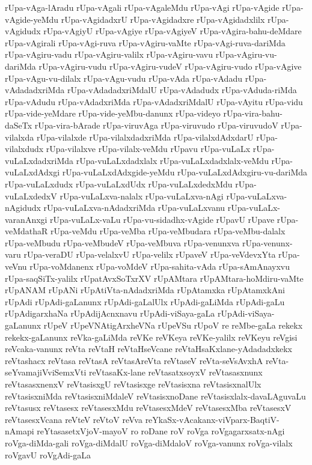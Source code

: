 {rUpa-vAga-lAradu
rUpa-vAgali
rUpa-vAgaleMdu
rUpa-vAgi
rUpa-vAgide
rUpa-vAgide-yeMdu
rUpa-vAgidadxrU
rUpa-vAgidadxre
rUpa-vAgidadxlilx
rUpa-vAgidudx
rUpa-vAgiyU
rUpa-vAgiye
rUpa-vAgiyeV
rUpa-vAgira-bahu-deMdare
rUpa-vAgirali
rUpa-vAgi-ruva
rUpa-vAgiru-vaMte
rUpa-vAgi-ruva-dariMda
rUpa-vAgiru-vadu
rUpa-vAgiru-valilx
rUpa-vAgiru-vavu
rUpa-vAgiru-vu-dariMda
rUpa-vAgiru-vudu
rUpa-vAgiru-vudeV
rUpa-vAgiru-vudo
rUpa-vAgive
rUpa-vAgu-vu-dilalx
rUpa-vAgu-vudu
rUpa-vAda
rUpa-vAdadu
rUpa-vAdadadxriMda
rUpa-vAdadadxriMdalU
rUpa-vAdadudx
rUpa-vAduda-riMda
rUpa-vAdudu
rUpa-vAdadxriMda
rUpa-vAdadxriMdalU
rUpa-vAyitu
rUpa-vidu
rUpa-vide-yeMdare
rUpa-vide-yeMbu-danunx
rUpa-videyo
rUpa-vira-bahu-daSeTx
rUpa-vira-bArade
rUpa-viruvAga
rUpa-viruvudo
rUpa-viruvudoV
rUpa-vilalxda
rUpa-vilalxde
rUpa-vilalxdadxriMda
rUpa-vilalxdAdxdarU
rUpa-vilalxdudx
rUpa-vilalxve
rUpa-vilalx-veMdu
rUpavu
rUpa-vuLaLx
rUpa-vuLaLxdadxriMda
rUpa-vuLaLxdadxlalx
rUpa-vuLaLxdadxlalx-veMdu
rUpa-vuLaLxdAdxgi
rUpa-vuLaLxdAdxgide-yeMdu
rUpa-vuLaLxdAdxgiru-vu-dariMda
rUpa-vuLaLxdudx
rUpa-vuLaLxdUdx
rUpa-vuLaLxdedxMdu
rUpa-vuLaLxdedxV
rUpa-vuLaLxva-nalalx
rUpa-vuLaLxva-nAgi
rUpa-vuLaLxva-nAgidudx
rUpa-vuLaLxva-nAdadxriMda
rUpa-vuLaLxvanu
rUpa-vuLaLx-varanAnxgi
rUpa-vuLaLx-vaLu
rUpa-vu-sidadhx-vAgide
rUpavU
rUpave
rUpa-veMdathaR
rUpa-veMdu
rUpa-veMba
rUpa-veMbudara
rUpa-veMbu-dalalx
rUpa-veMbudu
rUpa-veMbudeV
rUpa-veMbuva
rUpa-venunxva
rUpa-venunx-varu
rUpa-veraDU
rUpa-velalxvU
rUpa-velilx
rUpaveV
rUpa-veVdevxYta
rUpa-veVnu
rUpa-voMdanenx
rUpa-voMdeV
rUpa-sahita-vAda
rUpa-sAmAnayxvu
rUpa-saqSiTx-yalilx
rUpatAvxSoTxrXV
rUpAMtara
rUpAMtara-hoMdiru-vaMte
rUpANAM
rUpANi
rUpAtiVta-nAdadxriMda
rUpAtamxka
rUpAtamxkAni
rUpAdi
rUpAdi-gaLanunx
rUpAdi-gaLalUlx
rUpAdi-gaLiMda
rUpAdi-gaLu
rUpAdigarxhaNa
rUpAdijAcnxnavu
rUpAdi-viSaya-gaLa
rUpAdi-viSaya-gaLanunx
rUpeV
rUpeVNAtigArxheVNa
rUpeVSu
rUpoV
re
reMbe-gaLa
rekekx
rekekx-gaLanunx
reVka-gaLiMda
reVKe
reVKeya
reVKe-yalilx
reVKeyu
reVgisi
reVcaka-vanunx
reVta
reVtaH
reVtaHseVcane
reVtaHsaKxlane-yAdadadxkekx
reVtashacx
reVtasa
reVtasA
reVtasAreVta
reVtaseV
reVta-seVsAvxhA
reVta-seYvamajiVviSemxVti
reVtasaKx-lane
reVtasatxsoyxV
reVtasasxnunx
reVtasasxnenxV
reVtasisxgU
reVtasisxge
reVtasisxna
reVtasisxnalUlx
reVtasisxniMda
reVtasisxniMdaleV
reVtasisxnoDane
reVtasisxlalx-davaLAguvaLu
reVtasusx
reVtasesx
reVtasesxMdu
reVtasesxMdeV
reVtasesxMba
reVtasesxV
reVtasesxVcana
reVteV
reVtoV
reVva
reYkaSx-vAcakanx-viVparx-BaqtiV-nAmapi
reYtasasetxVjoV-mayoV
ro
roDane
roV
roVga
roVgagarxsatx-nAgi
roVga-diMda-gali
roVga-diMdalU
roVga-diMdaloV
roVga-vanunx
roVga-vilalx
roVgavU
roVgAdi-gaLa
}
